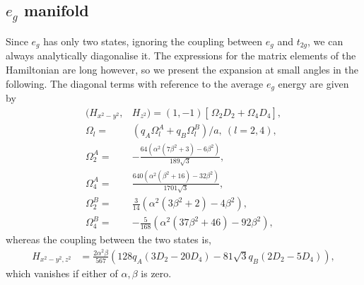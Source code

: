 \documentclass[a4paper,prb]{revtex4-1}  %
\newcommand{\com}[1]{}
\begin{document}
 



\subsection{$e_{g}$ manifold}



\com{
So we consider the general case of

both theta phi couples the two states..... expressions relatively longer, but, can be approximated by simpler expressions obtained by an expansion about zero angles.... 

simpler expressions of eigenstates and eigenvalues.... in terms of D2 and D4 terms of A and B.

presentation and discussion of eg splitting...
combined plots for the three cases w.r.t  angles... as three  rows
and two q values on the opposite side of the crossover...
so 2x3 panel figure.
}



Since $e_{g}$ has only two states,
ignoring the coupling between $e_{g}$ and $t_{2g}$,
we can always analytically diagonalise it.
The expressions for the
matrix elements of the Hamiltonian are long however,
so we present the expansion at small angles in the following.
The diagonal terms with reference to the average $e_g$ energy are given by
\begin{align}
\label{eq:eg-hiix}
(H_{x^2-y^2},&H_{z^2}) = (1,-1)
\left[\frac{}{} \Omega_{2}  D_2 + \Omega_4 D_4\right],\\
\Omega_{l} =&  \left(q_A \Omega_{l}^A + q_B\Omega_{l}^B\right)/a,~(l=2,4),\\
\Omega_{2}^A =&  -\frac{64 \left(\alpha ^2 \left(7 \beta ^2+3\right)-6 \beta ^2\right)}{189 \sqrt{3}},\\
\Omega_{4}^A =& \frac{640 \left(\alpha ^2 \left(\beta ^2+16\right)-32 \beta ^2\right)}{1701 \sqrt{3}},\\
\Omega_{2}^B =&  \frac{3}{14} \left(\alpha ^2 \left(3 \beta ^2+2\right)-4 \beta ^2\right),\\
\Omega_{4}^B =& -\frac{5}{168}\left(\alpha ^2 \left(37 \beta ^2+46\right)-92 \beta ^2\right),
\end{align}
whereas the coupling between the two states is,
\begin{align}
\label{eq:eg-hijx}
H_{x^2-y^2,z^2}&=
\frac{2\alpha ^2 \beta}{567} 
\left(128 q_A (3 D_2-20 D_4) - 81 \sqrt{3} q_B (2 D_2 -5 D_4)\right),
\end{align}
which vanishes if 
either of $\alpha,\beta$ is zero.
\end{document}
